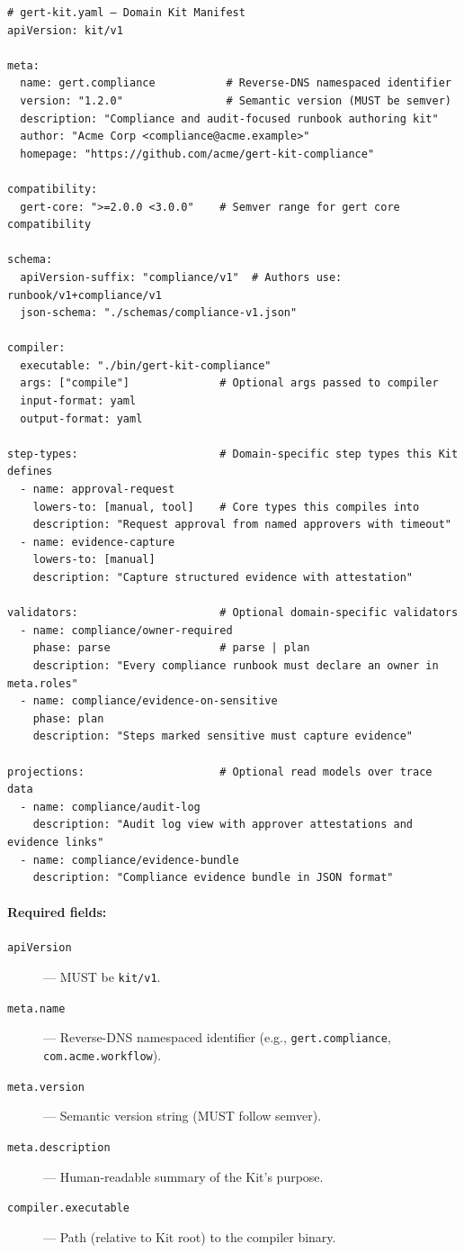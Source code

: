\begin{verbatim}
# gert-kit.yaml — Domain Kit Manifest
apiVersion: kit/v1

meta:
  name: gert.compliance           # Reverse-DNS namespaced identifier
  version: "1.2.0"                # Semantic version (MUST be semver)
  description: "Compliance and audit-focused runbook authoring kit"
  author: "Acme Corp <compliance@acme.example>"
  homepage: "https://github.com/acme/gert-kit-compliance"

compatibility:
  gert-core: ">=2.0.0 <3.0.0"    # Semver range for gert core compatibility

schema:
  apiVersion-suffix: "compliance/v1"  # Authors use: runbook/v1+compliance/v1
  json-schema: "./schemas/compliance-v1.json"

compiler:
  executable: "./bin/gert-kit-compliance"
  args: ["compile"]              # Optional args passed to compiler
  input-format: yaml
  output-format: yaml

step-types:                      # Domain-specific step types this Kit defines
  - name: approval-request
    lowers-to: [manual, tool]    # Core types this compiles into
    description: "Request approval from named approvers with timeout"
  - name: evidence-capture
    lowers-to: [manual]
    description: "Capture structured evidence with attestation"

validators:                      # Optional domain-specific validators
  - name: compliance/owner-required
    phase: parse                 # parse | plan
    description: "Every compliance runbook must declare an owner in meta.roles"
  - name: compliance/evidence-on-sensitive
    phase: plan
    description: "Steps marked sensitive must capture evidence"

projections:                     # Optional read models over trace data
  - name: compliance/audit-log
    description: "Audit log view with approver attestations and evidence links"
  - name: compliance/evidence-bundle
    description: "Compliance evidence bundle in JSON format"
\end{verbatim}

\paragraph{Required fields:}

\begin{description}
  \item[\texttt{apiVersion}] --- MUST be \texttt{kit/v1}.
  \item[\texttt{meta.name}] --- Reverse-DNS namespaced identifier (e.g.,
    \texttt{gert.compliance}, \texttt{com.acme.workflow}).
  \item[\texttt{meta.version}] --- Semantic version string (MUST follow semver).
  \item[\texttt{meta.description}] --- Human-readable summary of the Kit's purpose.
  \item[\texttt{compiler.executable}] --- Path (relative to Kit root) to the
    compiler binary.
\end{description}

